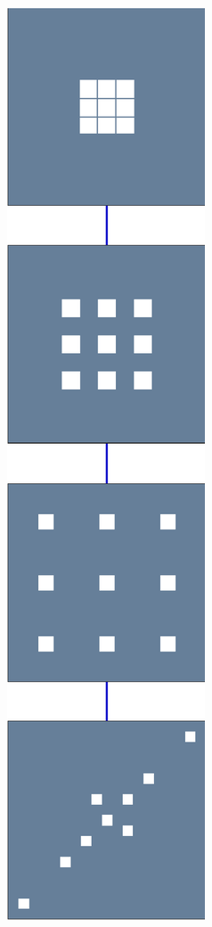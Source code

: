 \begin{figure}[!ht]
\begin{subfigure}[b]{0.085\textwidth}
	\includegraphics[width=\textwidth]{figures/exple-better-support/tree_expected.pdf}

\end{subfigure}
\end{figure}

